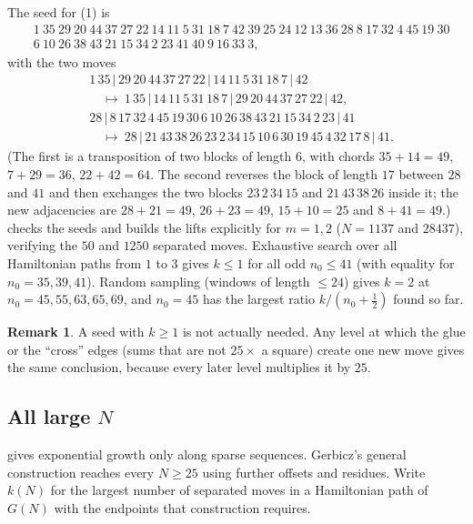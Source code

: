 \documentclass[11pt]{amsart}
\theoremstyle{definition}
\newtheorem{remark}[theorem]{Remark}
\begin{document}
The seed for (1) is
\[
\begin{aligned}
&1\ 35\ 29\ 20\ 44\ 37\ 27\ 22\ 14\ 11\ 5\ 31\ 18\ 7\ 42\ 39\ 25\ 24\ 12\ 13\ 36\ 28\ 8\ 17\ 32\ 4\ 45\ 19\ 30\\
&6\ 10\ 26\ 38\ 43\ 21\ 15\ 34\ 2\ 23\ 41\ 40\ 9\ 16\ 33\ 3,
\end{aligned}
\]
with the two moves
\[
\begin{aligned}
&1\,35\,|\,29\,20\,44\,37\,27\,22\,|\,14\,11\,5\,31\,18\,7\,|\,42\\
&\quad\longmapsto\ 1\,35\,|\,14\,11\,5\,31\,18\,7\,|\,29\,20\,44\,37\,27\,22\,|\,42,\\[2pt]
&28\,|\,8\,17\,32\,4\,45\,19\,30\,6\,10\,26\,38\,43\,21\,15\,34\,2\,23\,|\,41\\
&\quad\longmapsto\ 28\,|\,21\,43\,38\,26\,23\,2\,34\,15\,10\,6\,30\,19\,45\,4\,32\,17\,8\,|\,41 .
\end{aligned}
\]
(The first is a transposition of two blocks of length $6$, with chords
$35+14=49$, $7+29=36$, $22+42=64$. The second reverses the block of length $17$ between $28$ and $41$ and then
exchanges the two blocks $23\,2\,34\,15$ and $21\,43\,38\,26$ inside it; the new
adjacencies are $28+21=49$, $26+23=49$, $15+10=25$ and $8+41=49$.)  checks the seeds and builds the lifts
explicitly for $m=1,2$ ($N=1137$ and $28437$), verifying the $50$ and $1250$
separated moves. Exhaustive search over all Hamiltonian paths from $1$ to $3$ gives
$k\le1$ for all odd $n_0\le 41$ (with equality for $n_0=35,39,41$). Random sampling
(windows of length $\le24$) gives $k=2$ at $n_0=45,55,63,65,69$, and $n_0=45$ has the largest ratio
$k/(n_0+\frac12)$ found so far.

\begin{remark}
A seed with $k\ge1$ is not actually needed. Any level at which the glue or the
``cross'' edges (sums that are not $25\times$ a square) create one new move
gives the same conclusion, because every later level multiplies it by $25$.
\end{remark}

\subsection{All large $N$}
 gives exponential growth only along sparse sequences. Gerbicz's
general construction \cite{Gerbicz} reaches every $N\ge25$ using further offsets and
residues. Write $k(N)$ for the largest number of separated moves in a Hamiltonian path of
$G(N)$ with the endpoints that construction requires.
\end{document}
